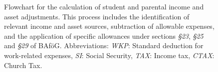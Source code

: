 \begin{landscape}
\begin{figure}[htbp]
{
}
  \caption{Flowchart for the calculation of student and parental income and asset adjustments. This process includes the identification of relevant income and asset sources, subtraction of allowable expenses, and the application of specific allowances under sections \textit{§23}, \textit{§25} and \textit{§29} of BAföG. Abbreviations:
  \emph{WKP}: Standard deduction for work-related expenses,
  \emph{SI}: Social Security,
  \emph{TAX}: Income tax,
  \emph{CTAX}: Church Tax.}
  \label{fig:pipeline-overview}
\end{figure}
\end{landscape}
